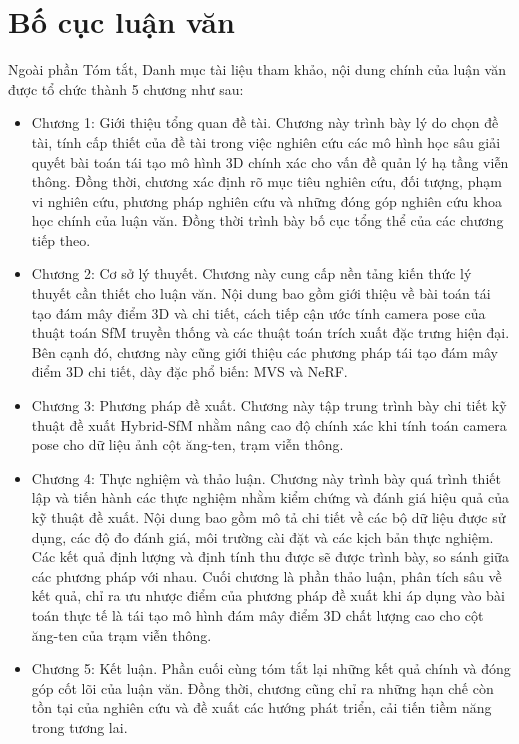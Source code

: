 \section{Bố cục luận văn}
Ngoài phần Tóm tắt, Danh mục tài liệu tham khảo, nội dung chính của luận văn được tổ chức thành 5 chương như sau:
\begin{itemize}
    \item Chương 1: Giới thiệu tổng quan đề tài. Chương này trình bày lý do chọn đề tài, tính cấp thiết của đề tài trong việc nghiên cứu các mô hình học sâu giải quyết bài toán tái tạo mô hình 3D chính xác cho vấn đề quản lý hạ tầng viễn thông. Đồng thời, chương xác định rõ mục tiêu nghiên cứu, đối tượng, phạm vi nghiên cứu, phương pháp nghiên cứu và những đóng góp nghiên cứu khoa học chính của luận văn. Đồng thời trình bày bố cục tổng thể của các chương tiếp theo.

    \item Chương 2: Cơ sở lý thuyết. Chương này cung cấp nền tảng kiến thức lý thuyết cần thiết cho luận văn. Nội dung bao gồm giới thiệu về bài toán tái tạo đám mây điểm 3D và chi tiết, cách tiếp cận ước tính camera pose của thuật toán SfM truyền thống và các thuật toán trích xuất đặc trưng hiện đại. Bên cạnh đó, chương này cũng giới thiệu các phương pháp tái tạo đám mây điểm 3D chi tiết, dày đặc phổ biến: MVS và NeRF.

    \item Chương 3: Phương pháp đề xuất. Chương này tập trung trình bày chi tiết kỹ thuật đề xuất Hybrid-SfM nhằm nâng cao độ chính xác khi tính toán camera pose cho dữ liệu ảnh cột ăng-ten, trạm viễn thông. 
    
    \item Chương 4: Thực nghiệm và thảo luận. Chương này trình bày quá trình thiết lập và tiến hành các thực nghiệm nhằm kiểm chứng và đánh giá hiệu quả của kỹ thuật đề xuất. Nội dung bao gồm mô tả chi tiết về các bộ dữ liệu được sử dụng, các độ đo đánh giá, môi trường cài đặt và các kịch bản thực nghiệm. Các kết quả định lượng và định tính thu được sẽ được trình bày, so sánh giữa các phương pháp với nhau. Cuối chương là phần thảo luận, phân tích sâu về kết quả, chỉ ra ưu nhược điểm của phương pháp đề xuất khi áp dụng vào bài toán thực tế là tái tạo mô hình đám mây điểm 3D chất lượng cao cho cột ăng-ten của trạm viễn thông.
    
    \item Chương 5: Kết luận. Phần cuối cùng tóm tắt lại những kết quả chính và đóng góp cốt lõi của luận văn. Đồng thời, chương cũng chỉ ra những hạn chế còn tồn tại của nghiên cứu và đề xuất các hướng phát triển, cải tiến tiềm năng trong tương lai.
\end{itemize}

